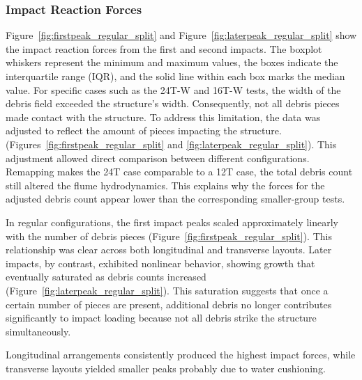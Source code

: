 \documentclass{article}
\begin{document}
{\subsubsection{Impact Reaction Forces} 
Figure~\ref{fig:firstpeak_regular_split} and Figure~\ref{fig:laterpeak_regular_split} show the impact reaction forces from the first and second impacts. The boxplot whiskers represent the minimum and maximum values, the boxes indicate the interquartile range (IQR), and the solid line within each box marks the median value.
For specific cases such as the 24T-W and 16T-W tests, the width of the debris field exceeded the structure’s width. Consequently, not all debris pieces made contact with the structure. To address this limitation, the data was adjusted to reflect the amount of pieces impacting the structure.  (Figures~\ref{fig:firstpeak_regular_split} and \ref{fig:laterpeak_regular_split}). This adjustment allowed direct comparison between different configurations. Remapping makes the 24T case comparable to a 12T case, the total debris count still altered the flume hydrodynamics. This explains why the forces for the adjusted debris count appear lower than the corresponding smaller-group tests. 

In regular configurations, the first impact peaks scaled approximately linearly with the number of debris pieces (Figure~\ref{fig:firstpeak_regular_split}). This relationship was clear across both longitudinal and transverse layouts. Later impacts, by contrast, exhibited nonlinear behavior, showing growth that eventually saturated as debris counts increased (Figure~\ref{fig:laterpeak_regular_split}). This saturation suggests that once a certain number of pieces are present, additional debris no longer contributes significantly to impact loading because not all debris strike the structure simultaneously.

Longitudinal arrangements consistently produced the highest impact forces, while transverse layouts yielded smaller peaks probably due to water cushioning.

}
\end{document}
